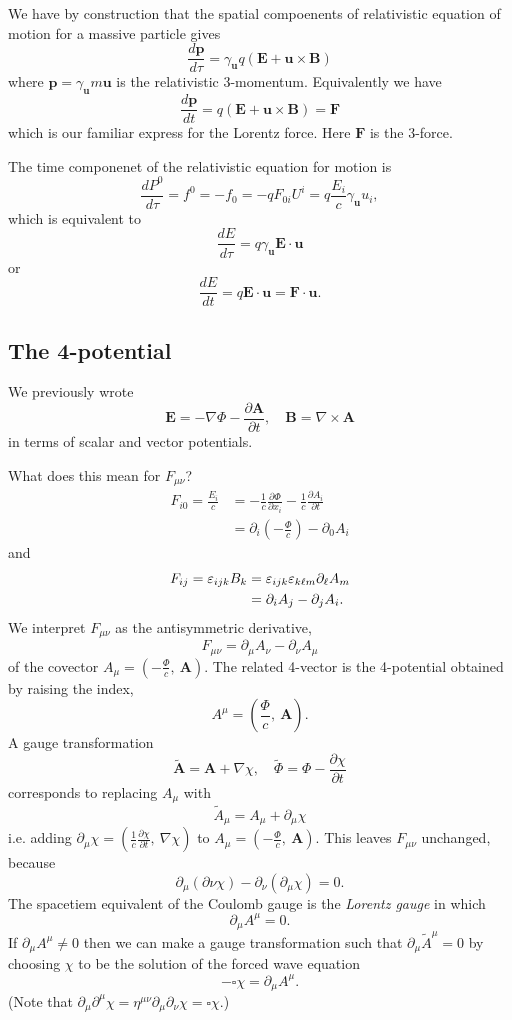 \documentclass{article}
\begin{document}
We have by construction that the spatial compoenents of relativistic equation of motion for a massive particle gives
\[
	\frac{d\mathbf p}{d\tau} = \gamma_{\mathbf u} q(\mathbf E + \mathbf u\times\mathbf B)
\]
where $ \mathbf p = \gamma_{\mathbf u} m \mathbf u $ is the relativistic 3-momentum. Equivalently we have
\[
	\frac{d\mathbf p}{dt} = q(\mathbf E +\mathbf u\times\mathbf B) = \mathbf F
\]
which is our familiar express for the Lorentz force. Here $ \mathbf F $ is the 3-force.\par
The time componenet of the relativistic equation for motion is
\[
	\frac{dP^0}{d\tau} = f^0 = -f_0 = -qF_{0i}U^i = q\frac{E_i}c \gamma_{\mathbf u} u_i,
\]
which is equivalent to
\[
	\frac{dE}{d\tau} = q \gamma_{\mathbf u}\mathbf E \cdot\mathbf u
\]
or
\[
	\frac{dE}{dt} = q \mathbf E\cdot\mathbf u = \mathbf F \cdot\mathbf u.
\]
\subsection{The 4-potential}
We previously wrote 
\[
	\mathbf E = - \nabla\Phi - \frac{\partial \mathbf A}{\partial t}, \quad \mathbf B = \nabla\times\mathbf A
\]
in terms of scalar and vector potentials.\par
What does this mean for $ F_{\mu\nu} $?
\begin{align*}
	F_{i0} = \frac{E_i}c &= - \frac 1c \frac{\partial \Phi}{\partial x_i} - \frac 1c \frac{\partial A_i}{\partial t} \\
			     &= \partial_i\left(-\frac{\Phi}c \right) - \partial_0 A_i
\end{align*}
and
\begin{align*}
	F_{ij} = \varepsilon_{ijk}B_k &= \varepsilon_{ijk}\varepsilon_{k\ell m} \partial_\ell A_m \\
			      &= \partial_iA_j - \partial_j A_i.
\end{align*}
We interpret $ F_{\mu\nu} $ as the antisymmetric derivative,
\[
	F_{\mu\nu} = \partial_\mu A_\nu - \partial_\nu A_\mu
\]
of the covector $ A_\mu = \left(-\frac \Phi c, \ \mathbf A\right) $. The related 4-vector is the 4-potential obtained by raising the index,
\[
  A^\mu = \left(\frac \Phi c, \ \mathbf A\right). 
\]
A gauge transformation
\[
	\tilde{\mathbf A} = \mathbf A + \nabla\chi, \quad \tilde\Phi = \Phi - \frac{\partial \chi}{\partial t}
\]
corresponds to replacing $ A_\mu $ with
\[
  \tilde A_\mu = A_\mu + \partial_\mu \chi
\]
i.e. adding $ \partial_\mu \chi = \left(\frac 1c\frac{\partial \chi}{\partial t},\ \nabla \chi\right) $ to $ A_\mu = \left(-\frac \Phi c , \ \mathbf A\right) $. This leaves $ F_{\mu\nu} $ unchanged, because
\[
  \partial_\mu(\partial\nu\chi) - \partial_\nu(\partial_\mu\chi) = 0.
\]
The spacetiem equivalent of the Coulomb gauge is the \textit{Lorentz gauge} in which
\[
  \partial_\mu A^\mu = 0.
\]
If $ \partial_\mu A^\mu \ne 0 $ then we can make a gauge transformation such that $ \partial_\mu \tilde A^\mu = 0 $ by choosing $ \chi $ to be the solution of the forced wave equation
\[
  -\square \chi = \partial_\mu A^\mu.
\]
(Note that $ \partial_\mu \partial^\mu \chi = \eta^{\mu\nu}\partial_\mu\partial_\nu\chi = \square \chi $.)
\end{document}

